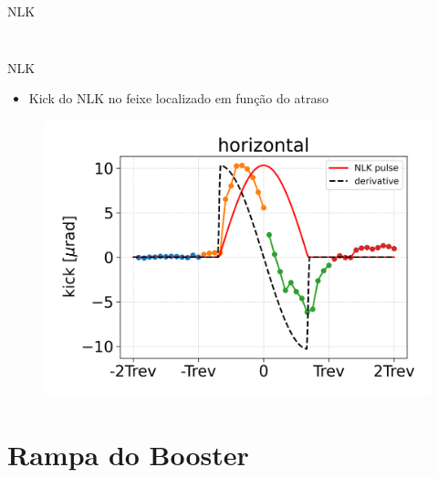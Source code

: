 \documentclass{beamer}					  %
\begin{document}
\begin{frame}{NLK}
\begin{columns}
\begin{column}{0.4\textwidth}
\begin{figure}[H]
                \label{fig:hcoil-table}
            \end{figure}
        \end{column}
    \end{columns}
\end{frame}

\begin{frame}{NLK}
    \vspace{0.2 cm}
    \begin{itemize}
            \item Kick do NLK no feixe localizado em função do atraso
    \end{itemize}
        \begin{figure}[H]
            \centering
            \includegraphics[width=1\textwidth]{2024-03-08/figures/hcoil-kick.png}
            \label{fig:hcoil-distortion}
        \end{figure}
\end{frame}


\section{Rampa do Booster}
\end{document}
